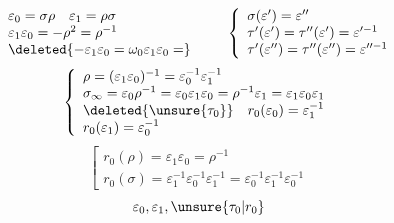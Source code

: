 \[
\begin{array}{l}
\varepsilon_0=\sigma\rho\quad\varepsilon_1=\rho\sigma\\
\varepsilon_1\varepsilon_0=-\rho^2=\rho^{-1}\\
\deleted{-\varepsilon_1\varepsilon_0=\omega_0\varepsilon_1\varepsilon_0=}
\end{array}
\qquad
\left\{\begin{array}{l}
\sigma(\varepsilon')=\varepsilon''\\
\tau'(\varepsilon')=\tau''(\varepsilon')=\varepsilon^{\prime-1}\\
\tau'(\varepsilon'')=\tau''(\varepsilon'')=\varepsilon^{\prime\prime-1}
\end{array}\right.
\]
\[
\left\{\begin{array}{l}
\rho=(\varepsilon_1\varepsilon_0)^{-1}=\varepsilon_0^{-1}\varepsilon_1^{-1}\\
\sigma_\infty=\varepsilon_0\rho^{-1}=\varepsilon_0\varepsilon_1\varepsilon_0=\rho^{-1}\varepsilon_1=\varepsilon_1\varepsilon_0\varepsilon_1\\
\deleted{\unsure{\tau_0}}\quad r_0(\varepsilon_0)=\varepsilon_1^{-1}\\
r_0(\varepsilon_1)=\varepsilon_0^{-1}
\end{array}\right.
\]
\[
\left[\begin{array}{l}
r_0(\rho)=\varepsilon_1\varepsilon_0=\rho^{-1}\\
r_0(\sigma)=\varepsilon_1^{-1}\varepsilon_0^{-1}\varepsilon_1^{-1}=\varepsilon_0^{-1}\varepsilon_1^{-1}\varepsilon_0^{-1}
\end{array}\right.
\]
\[
\varepsilon_0,\varepsilon_1,\unsure{\tau_0|r_0}
\]

